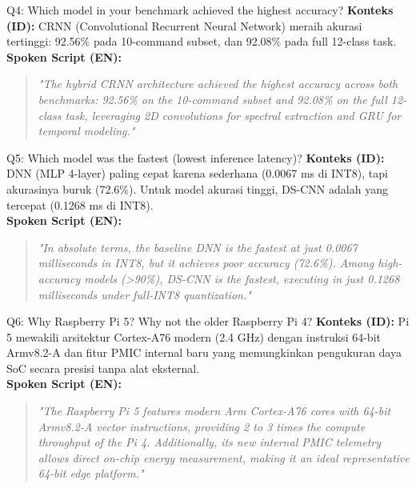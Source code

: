 \documentclass[11pt,a4paper]{article}
\begin{document}
\begin{easybox}{Q4: Which model in your benchmark achieved the highest accuracy?}
\textbf{Konteks (ID):} CRNN (Convolutional Recurrent Neural Network) meraih akurasi tertinggi: 92.56\% pada 10-command subset, dan 92.08\% pada full 12-class task.\\
\textbf{Spoken Script (EN):}
\begin{quote}
\small
\textit{"The hybrid CRNN architecture achieved the highest accuracy across both benchmarks: 92.56\% on the 10-command subset and 92.08\% on the full 12-class task, leveraging 2D convolutions for spectral extraction and GRU for temporal modeling."}
\end{quote}
\end{easybox}

\begin{easybox}{Q5: Which model was the fastest (lowest inference latency)?}
\textbf{Konteks (ID):} DNN (MLP 4-layer) paling cepat karena sederhana (0.0067 ms di INT8), tapi akurasinya buruk (72.6\%). Untuk model akurasi tinggi, DS-CNN adalah yang tercepat (0.1268 ms di INT8).\\
\textbf{Spoken Script (EN):}
\begin{quote}
\small
\textit{"In absolute terms, the baseline DNN is the fastest at just 0.0067 milliseconds in INT8, but it achieves poor accuracy (72.6\%). Among high-accuracy models (>90\%), DS-CNN is the fastest, executing in just 0.1268 milliseconds under full-INT8 quantization."}
\end{quote}
\end{easybox}

\begin{easybox}{Q6: Why Raspberry Pi 5? Why not the older Raspberry Pi 4?}
\textbf{Konteks (ID):} Pi 5 mewakili arsitektur Cortex-A76 modern (2.4 GHz) dengan instruksi 64-bit Armv8.2-A dan fitur PMIC internal baru yang memungkinkan pengukuran daya SoC secara presisi tanpa alat eksternal.\\
\textbf{Spoken Script (EN):}
\begin{quote}
\small
\textit{"The Raspberry Pi 5 features modern Arm Cortex-A76 cores with 64-bit Armv8.2-A vector instructions, providing 2 to 3 times the compute throughput of the Pi 4. Additionally, its new internal PMIC telemetry allows direct on-chip energy measurement, making it an ideal representative 64-bit edge platform."}
\end{quote}
\end{easybox}
\end{document}
